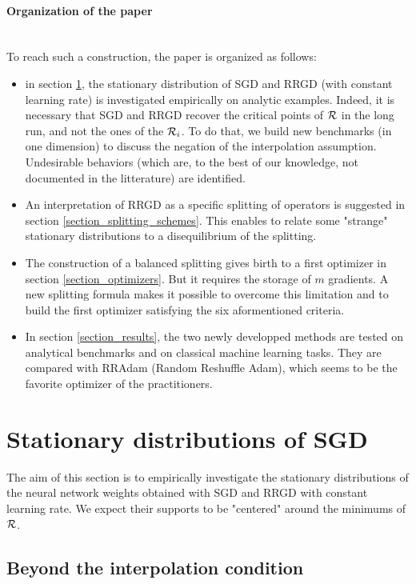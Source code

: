\paragraph{Organization of the paper}
~~\\
To reach such a construction, the paper is organized as follows:
\begin{itemize}
	\item in section \ref{section_stationary}, the stationary distribution of SGD and RRGD (with constant learning rate) is investigated empirically on analytic examples.
          Indeed, it is necessary that SGD and RRGD recover the critical points of $\mathcal{R}$ in the long run, and not the ones of the $\mathcal{R}_i$. To do that, we build new benchmarks (in one
          dimension) to discuss the negation of the interpolation assumption. Undesirable behaviors (which are, to the best of our knowledge, not documented in the litterature) are identified. 
	\item An interpretation of RRGD as a specific splitting of operators is suggested in section \ref{section_splitting_schemes}. This enables to relate some "strange" stationary distributions to a disequilibrium of the splitting. 
	\item The construction of a balanced splitting gives birth to a first optimizer in section \ref{section_optimizers}. But it requires the storage of $m$ gradients. A new
          splitting formula makes it possible to overcome this limitation and to build the first optimizer satisfying the six aformentioned criteria.
	\item In section \ref{section_results}, the two newly developped methods are tested on analytical benchmarks and on classical machine learning tasks. They are compared with
          RRAdam (Random Reshuffle Adam), which seems to be the favorite optimizer of the practitioners.   
\end{itemize}

\section{Stationary distributions of SGD}
\label{section_stationary}

The aim of this section is to empirically investigate the stationary distributions of the neural network weights obtained with SGD and RRGD with constant learning rate. We expect
their supports to be "centered" around the minimums of $\mathcal{R}$.

\subsection{Beyond the interpolation condition}
\label{subsection_beyond_interpolation}


